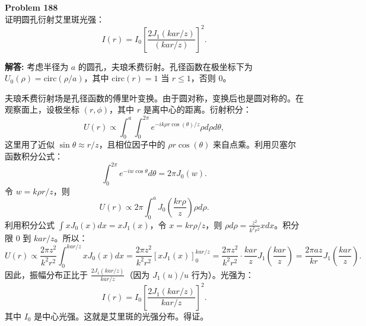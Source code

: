 \documentclass[12pt, a4paper, oneside]{ctexart}
\newenvironment{solution}{\par\noindent\textbf{解答:}\quad}{\par}
\begin{document}
\begin{mdframed}[backgroundcolor=gray!10, linewidth=0pt]
    \textbf{Problem 188} \\
    证明圆孔衍射艾里斑光强：
    \[
    I(r) = I_0 \left[ \frac{2 J_1(k a r / z)}{(k a r / z)} \right]^2.
    \]
\end{mdframed}
\begin{solution}
    考虑半径为 $a$ 的圆孔，夫琅禾费衍射。孔径函数在极坐标下为 $U_0(\rho) = \text{circ}(\rho/a)$，其中 $\text{circ}(r)=1$ 当 $r\le 1$，否则 $0$。

    夫琅禾费衍射场是孔径函数的傅里叶变换。由于圆对称，变换后也是圆对称的。在观察面上，设极坐标 $(r, \phi)$，其中 $r$ 是离中心的距离。衍射积分：
    \[
    U(r) \propto \int_0^a \int_0^{2\pi} e^{-i k \rho r \cos(\theta)/z} \rho d\rho d\theta,
    \]
    这里用了近似 $\sin\theta \approx r/z$，且相位因子中的 $\rho r \cos(\theta)$ 来自点乘。利用贝塞尔函数积分公式：
    \[
    \int_0^{2\pi} e^{-i w \cos\theta} d\theta = 2\pi J_0(w).
    \]
    令 $w = k \rho r / z$，则
    \[
    U(r) \propto 2\pi \int_0^a J_0\left( \frac{k r \rho}{z} \right) \rho d\rho.
    \]
    利用积分公式 $\int x J_0(x) dx = x J_1(x)$，令 $x = k r \rho / z$，则 $\rho d\rho = \frac{z^2}{k^2 r^2} x dx$。积分限 $0$ 到 $k a r / z$。所以：
    \[
    U(r) \propto \frac{2\pi z^2}{k^2 r^2} \int_0^{k a r / z} x J_0(x) dx = \frac{2\pi z^2}{k^2 r^2} \left[ x J_1(x) \right]_0^{k a r / z} = \frac{2\pi z^2}{k^2 r^2} \cdot \frac{k a r}{z} J_1\left( \frac{k a r}{z} \right) = \frac{2\pi a z}{k r} J_1\left( \frac{k a r}{z} \right).
    \]
    因此，振幅分布正比于 $\frac{2 J_1(k a r / z)}{k a r / z}$（因为 $J_1(u)/u$ 行为）。光强为：
    \[
    I(r) = I_0 \left[ \frac{2 J_1(k a r / z)}{k a r / z} \right]^2.
    \]
    其中 $I_0$ 是中心光强。这就是艾里斑的光强分布。得证。
\end{solution}
\end{document}
